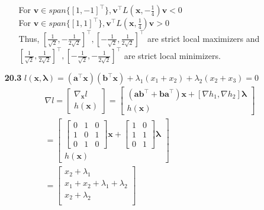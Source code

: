 \documentclass[10pt]{article}
\begin{document}
\begin{enumerate}
\begin{enumerate}
        For $\mathbf{v}\in span\{{[1,-1]}^\top\}, \mathbf{v}^\top L(\mathbf{x},-\frac{1}{4})\mathbf{v}<0$\\
        For $\mathbf{v}\in span\{{[1,1]}^\top\}, \mathbf{v}^\top L(\mathbf{x},\frac{1}{4})\mathbf{v}>0$\\
        Thus, ${[\frac{1}{\sqrt{2}},-\frac{1}{2\sqrt{2}}]}^\top,{[-\frac{1}{\sqrt{2}},\frac{1}{2\sqrt{2}}]}^\top$ are strict local maximizers and ${[\frac{1}{\sqrt{2}},\frac{1}{2\sqrt{2}}]}^\top,{[-\frac{1}{\sqrt{2}},-\frac{1}{2\sqrt{2}}]}^\top$ are strict local minimizers.
    \end{enumerate}
    \item [\textbf{20.3}] $l(\mathbf{x},\mathbf{\lambda})=(\mathbf{a}^\top\mathbf{x})(\mathbf{b}^\top\mathbf{x})+\lambda_1(x_1+x_2)+\lambda_2(x_2+x_3)=0$\\
    \begin{align*}
        &\nabla l=\begin{bmatrix}
            \nabla_\mathbf{x} l\\
            h(\mathbf{x})
        \end{bmatrix}=\begin{bmatrix}
            (\mathbf{ab}^\top+\mathbf{ba}^\top)\mathbf{x}+[\nabla h_1,\nabla h_2]\mathbf{\lambda}\\
            h(\mathbf{x})
        \end{bmatrix}\\
        &=\begin{bmatrix}
            \begin{bmatrix}
                0 & 1 & 0\\
                1 & 0 & 1\\
                0 & 1 & 0
            \end{bmatrix}\mathbf{x}+\begin{bmatrix}
                1 & 0\\
                1 & 1\\
                0 & 1
            \end{bmatrix}\mathbf{\lambda}\\
            h(\mathbf{x})
        \end{bmatrix}\\
        &=\begin{bmatrix}
            x_2+\lambda_1\\
            x_1+x_2+\lambda_1+\lambda_2\\
            x_2+\lambda_2\\

\end{bmatrix}
\end{align*}
\end{enumerate}
\end{document}

